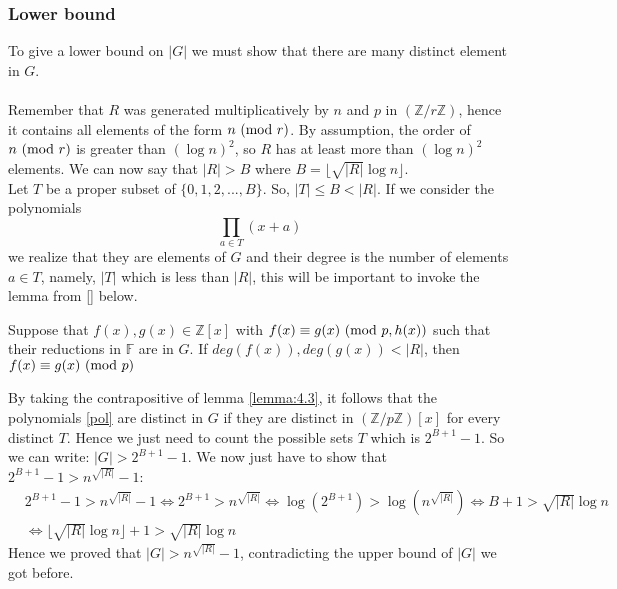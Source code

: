 \documentclass[../main.tex]{subfiles}
\begin{document}
\subsubsection*{Lower bound}
To give a lower bound on $|G|$ we must show that there are many distinct element in $G$.\\\\
Remember that $R$ was generated multiplicatively by $n$ and $p$ in $(\mathbb{Z}/r\mathbb{Z})$, hence it contains all elements of the form $n \ (\mathrm{mod}\ r)$. By assumption, the order of $n\ (\mathrm{mod}\ r)$ is greater than $(\log n)^2$, so $R$ has at least more than $(\log n)^2$ elements. We can now say that $|R|>B$ where $B=\lfloor \sqrt{|R|}\log n\rfloor$.\\
Let $T$ be a proper subset of $\{0,1,2,...,B\}$. So, $|T|\leq B<|R|$. If we consider the polynomials
\begin{equation}
\label{pol}
    \prod_{a\in T}(x+a)
\end{equation}
we realize that they are elements of $G$ and their degree is the number of elements $a\in T$, namely, $|T|$ which is less than $|R|$, this will be important to invoke the lemma from \ref{} below.
\begin{lemma}
\label{lemma:4.3}
    Suppose that $f(x), g(x)\in\mathbb{Z}[x]$ with $f(x)\equiv g(x) \ (\mathrm{mod}\ p,h(x))$ such that their reductions in $\mathbb{F}$ are in $G$.
    If $deg(f(x)),deg(g(x))<|R|$, then $f(x)\equiv g(x) \ (\mathrm{mod}\ p)$
\end{lemma}
By taking the contrapositive of lemma \ref{lemma:4.3}, it follows that the polynomials \ref{pol} are distinct in $G$ if they are distinct in $(\mathbb{Z}/p\mathbb{Z})[x]$ for every distinct $T$.
Hence we just need to count the possible sets $T$ which is $2^{B+1}-1$.
So we can write: $|G|>2^{B+1}-1$. We now just have to show that $2^{B+1}-1>n^{\sqrt{|R|}}-1$:
\begin{align*}
& 2^{B+1}-1>n^{\sqrt{|R|}}-1 \Longleftrightarrow 2^{B+1}>n^{\sqrt{|R|}} \Longleftrightarrow \log {(2^{B+1})} > \log {(n^{\sqrt{|R|}})}\Longleftrightarrow B+1 > \sqrt{|R|}\log n\\
& \Longleftrightarrow \lfloor\sqrt{|R|}\log n\rfloor+1 > \sqrt{|R|}\log n
\end{align*}
Hence we proved that $|G|>n^{\sqrt{|R|}}-1$, contradicting the upper bound of $|G|$ we got before.

\newpage
\end{document}
